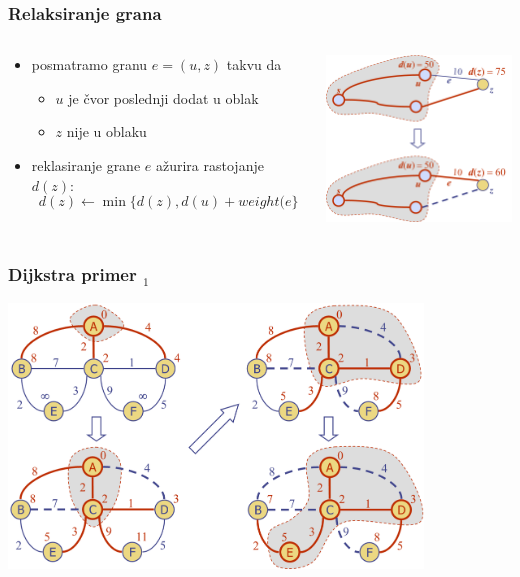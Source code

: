 \documentclass[compress]{beamer}
\begin{document}
\begin{frame}[fragile]
  \frametitle{Relaksiranje grana}
  \begin{columns}
    \begin{column}[t]{6cm}
      \begin{itemize}
        \item posmatramo granu $e=(u,z)$ takvu da
        \begin{itemize}
          \item $u$ je čvor poslednji dodat u oblak
          \item $z$ nije u oblaku
        \end{itemize}
        \item reklasiranje grane $e$ ažurira rastojanje $d(z)$:
          $$ d(z) \leftarrow \min\{d(z), d(u)+weight(e\}$$
      \end{itemize}
    \end{column}
    \begin{column}[t]{6cm}
  \begin{center}
    \includegraphics[width=5cm]{asp-14-pic61.png}
  \end{center}
    \end{column}
  \end{columns}
\end{frame}

\begin{frame}[fragile]
  \frametitle{Dijkstra primer $_1$}
  \begin{center}
    \includegraphics[width=11cm]{asp-14-pic62.png}
  \end{center}
\end{frame}
\end{document}
